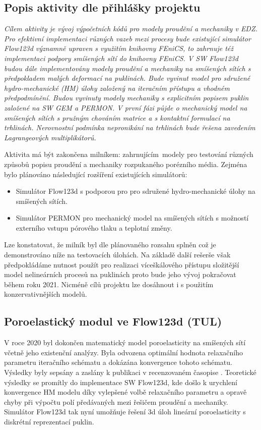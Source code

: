 \documentclass[11pt,a4paper]{article}
\begin{document}
\begin{onehalfspacing}
\subsection{Popis aktivity dle přihlášky projektu}
{ \it
Cílem aktivity je vývoj výpočetních kódů pro modely proudění a mechaniky v EDZ. Pro efektivní implementaci různých vazeb mezi
procesy bude existující simulátor Flow123d významně upraven s využitím knihovny FEniCS, to zahrnuje též implementaci podpory
smíšených sítí do knihovny FEniCS. V SW Flow123d budou dále implementovány modely proudění a mechaniky na smíšených sítích s
předpokladem malých deformací na puklinách.
Bude vyvinut model pro sdružené hydro-mechanické (HM) úlohy založený na iteračním přístupu a vhodném předpodmínění.
Budou vyvinuty modely mechaniky s explicitním popisem puklin založené na SW GEM a PERMON. V první fázi půjde o mechanický
model na smíšených sítích s pružným chováním matrice a s kontaktní formulací na trhlinách. Nerovnostní podmínka nepronikání na
trhlinách bude řešena zavedením Lagrangeových multiplikátorů.}

Aktivita má být zakončena milníkem:  zahrnujícím~modely pro testování různých způsobů popisu proudění a mechaniky rozpukaného porézního média. Zejména bylo plánováno následující rozšíření existujících simulátorů:
\begin{itemize}
\item Simulátor Flow123d s podporou pro pro sdružené hydro-mechanické úlohy na smíšených sítích.
\item Simulátor PERMON pro mechanický model na smíšených sítích s možností externího vstupu pórového tlaku a teplotní změny.
\end{itemize}

Lze konstatovat, že milník byl dle plánovaného rozsahu splněn což je demonstrováno níže na testovacích úlohách. Na základě další rešerše však předpokládáme 
nutnost použít pro realizaci víceškálového přístupu složitější model nelineárních procesů na puklinách proto bude jeho vývoj pokračovat během roku 2021. Nicméně cílů projektu lze dosáhnout i s použitím konzervativnějších modelů.


\subsection{Poroelastický modul ve Flow123d (TUL)}
V roce 2020 byl dokončen matematický model poroelasticity na smíšených sítí včetně jeho existenční analýzy.
Byla odvozena optimální hodnota relaxačního parametru iteračního schématu  a dokázána konvergence tohoto schématu.
Výsledky byly sepsány a zaslány k publikaci v recenzovaném časopise \cite{brezina_stebel_preprint}.
Teoretické výsledky se promítly do implementace SW Flow123d, kde došlo k urychlení konvergence HM modelu díky vylepšené 
volbě relaxačního parametru a opravě chyby při výpočtu polí předávaných mezi řešičem proudění a mechaniky.
Simulátor Flow123d tak nyní umožňuje řešení 3d úloh lineární poroelasticity s diskrétní reprezentací puklin.


\end{onehalfspacing}
\end{document}
